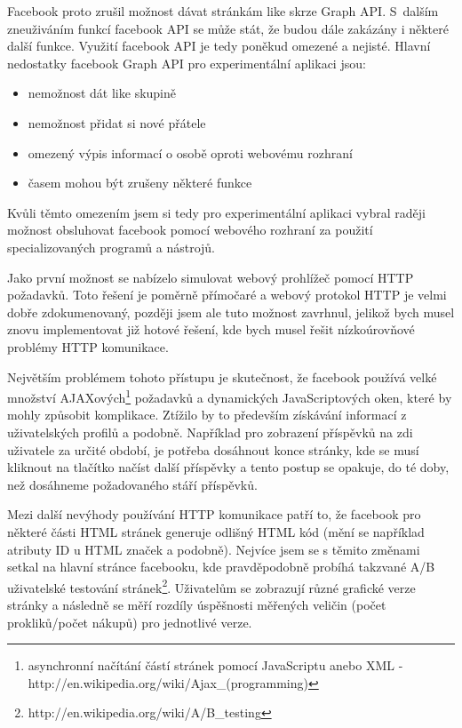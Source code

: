 \documentclass[thesis=M,czech]{FITthesis}[2013/05/10]
\begin{document}
Facebook proto zrušil možnost dávat stránkám like skrze Graph API. 
S~dalším zneuživáním funkcí facebook API se může stát, že budou
dále zakázány i některé další funkce. Využití facebook API je tedy 
poněkud omezené a nejisté. Hlavní nedostatky facebook Graph API pro
experimentální aplikaci jsou:

\begin{itemize}
  \item nemožnost dát like skupině
  \item nemožnost přidat si nové přátele
  \item omezený výpis informací o osobě oproti webovému rozhraní
  \item časem mohou být zrušeny některé funkce
\end{itemize}

Kvůli těmto omezením jsem si tedy pro experimentální aplikaci vybral 
raději možnost obsluhovat facebook pomocí webového rozhraní za použití 
specializovaných programů a nástrojů.

Jako první možnost se nabízelo simulovat webový prohlížeč pomocí HTTP 
požadavků. Toto řešení je poměrně přímočaré a webový protokol HTTP je 
velmi dobře zdokumenovaný, později jsem ale tuto možnost zavrhnul, 
jelikož bych musel znovu implementovat již hotové řešení, kde bych 
musel řešit nízkoúrovňové problémy HTTP komunikace. 

Největším problémem tohoto přístupu je skutečnost, že facebook používá 
velké množství 
AJAXových\footnote{asynchronní načítání částí stránek pomocí JavaScriptu anebo XML - http://en.wikipedia.org/wiki/Ajax\_(programming)} 
požadavků a dynamických JavaScriptových oken, které by mohly způsobit
komplikace. Ztížilo by to především získávání informací z 
uživatelských profilů a podobně. Například pro zobrazení příspěvků na 
zdi uživatele za určité období, je potřeba dosáhnout konce stránky, 
kde se musí kliknout na tlačítko načíst další příspěvky a tento postup 
se opakuje, do té doby, než dosáhneme požadovaného stáří příspěvků.

Mezi další nevýhody používání HTTP komunikace patří to, že facebook 
pro některé části HTML stránek generuje odlišný HTML kód (mění se 
například atributy ID u HTML značek a podobně). Nejvíce jsem se s 
těmito změnami setkal na hlavní stránce facebooku, kde pravděpodobně 
probíhá takzvané A/B uživatelské testování 
stránek\footnote{http://en.wikipedia.org/wiki/A/B\_testing}. 
Uživatelům se zobrazují různé grafické verze stránky a následně 
se měří rozdíly úspěšnosti měřených veličin (počet prokliků/počet 
nákupů) pro jednotlivé verze. 
\end{document}
